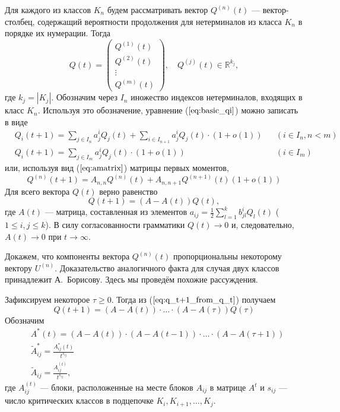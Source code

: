 \documentclass[12pt]{article}
\renewcommand{\leq}{\leqslant}
\renewcommand{\geq}{\geqslant}
\begin{document}
{Для каждого из классов $K_n$ будем рассматривать вектор $Q^{(n)}(t)$ --- вектор-столбец, содержащий вероятности продолжения для нетерминалов из класса $K_n$ в порядке их нумерации. Тогда
\begin{equation}
	Q(t) =
	\begin{pmatrix}
		Q^{(1)}(t) \\
		Q^{(2)}(t) \\
		\vdots \\
		Q^{(m)}(t)
	\end{pmatrix},
	\quad Q^{(j)}(t) \in \mathbb{R}^{k_j},
\end{equation}
где $k_j = \left| K_j \right|$. Обозначим через $I_n$ иножество индексов нетерминалов, входящих в класс $K_n$. Используя это обозначение, уравнение ($\ref{eq:basic_qi}$) можно записать в виде
\begin{align}
	&Q_i(t+1) = \sum_{j \in I_n} a^i_j Q_j(t) + \sum_{i \in I_{n+1}} a^i_j Q_j(t) \cdot (1 + o(1)) & &(i \in I_n, n < m) \\
	&Q_i(t+1) = \sum_{j \in I_m} a^i_j Q_j(t) \cdot (1 + o(1)) & &(i \in I_m)
\end{align}
или, используя вид ($\ref{eq:amatrix}$) матрицы первых моментов,
\begin{equation}
	Q^{(n)}(t+1) = A_{n,n} Q^{(n)}(t) + A_{n,n+1} Q^{(n+1)}(t) (1 + o(1))
\end{equation}
Для всего вектора $Q(t)$ верно равенство
\begin{equation}
\label{eq:q_t+1_from_q_t}
	Q(t+1) = (A - A(t)) Q(t),
\end{equation}
где $A(t)$ --- матрица, составленная из элементов $a_{ij} = \frac{1}{2} \sum_{l = 1}^k b^i_{jl} Q_l(t)$ ($1 \leq i,j \leq k$). В силу согласованности грамматики $Q(t) \rightarrow 0$ и, следовательно, $A(t) \rightarrow 0$ при $t \rightarrow \infty$.

Докажем, что компоненты вектора $Q^{(n)}(t)$ пропорциональны некоторому вектору $U^{(n)}$. Доказательство аналогичного факта для случая двух классов принадлежит А.~Борисову. Здесь мы проведём похожие рассуждения.

Зафиксируем некоторое $\tau \geq 0$. Тогда из ($\ref{eq:q_t+1_from_q_t}$) получаем
\begin{equation}
\label{eq:q_t+1_from_q_tau}
	Q(t+1) = (A - A(t)) \cdot \ldots \cdot (A - A(\tau)) Q(\tau)
\end{equation}
Обозначим
\begin{equation}
	\begin{split}
		&A^*(t) = (A - A(t)) \cdot (A - A(t-1)) \cdot \ldots \cdot (A - A(\tau + 1)) \\
		&\tilde{A}^*_{ij} = \frac{A^*_{ij}(t)}{t^{s_{ij}}} \\
		&\tilde{A}_{ij} = \frac{A^{(t)}_{ij}}{t^{s_{ij}}},
	\end{split}
\end{equation}
где $A^{(t)}_{ij}$ --- блоки, расположенные на месте блоков $A_{ij}$ в матрице $A^t$ и $s_{ij}$ --- число критических классов в подцепочке $K_i, K_{i+1}, \ldots, K_j$.


}
\end{document}
